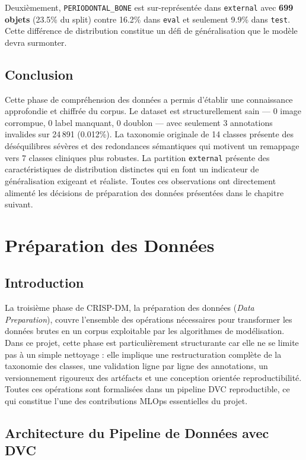 \documentclass{rapportENSIAS}
\begin{document}
Deuxièmement, \texttt{PERIODONTAL\_BONE} est sur-représentée dans
\texttt{external} avec \textbf{699 objets} (23.5\% du split) contre 16.2\%
dans \texttt{eval} et seulement 9.9\% dans \texttt{test}. Cette différence
de distribution constitue un défi de généralisation que le modèle devra surmonter.


\section{Conclusion}

Cette phase de compréhension des données a permis d'établir une connaissance
approfondie et chiffrée du corpus. Le dataset est structurellement sain —
0 image corrompue, 0 label manquant, 0 doublon — avec seulement 3 annotations
invalides sur 24\,891 (0.012\%). La taxonomie originale de 14 classes présente
des déséquilibres sévères et des redondances sémantiques qui motivent un
remappage vers 7 classes cliniques plus robustes. La partition \texttt{external}
présente des caractéristiques de distribution distinctes qui en font un
indicateur de généralisation exigeant et réaliste. Toutes ces observations
ont directement alimenté les décisions de préparation des données présentées
dans le chapitre suivant.



\chapter{Préparation des Données}
\label{chap:data_preparation}

\section{Introduction}

La troisième phase de CRISP-DM, la préparation des données (\textit{Data Preparation}),
couvre l'ensemble des opérations nécessaires pour transformer les données brutes
en un corpus exploitable par les algorithmes de modélisation. Dans ce projet,
cette phase est particulièrement structurante car elle ne se limite pas à un
simple nettoyage : elle implique une restructuration complète de la taxonomie
des classes, une validation ligne par ligne des annotations, un versionnement
rigoureux des artéfacts et une conception orientée reproductibilité. Toutes ces
opérations sont formalisées dans un pipeline DVC reproductible, ce qui constitue
l'une des contributions MLOps essentielles du projet.

\section{Architecture du Pipeline de Données avec DVC}
\end{document}
